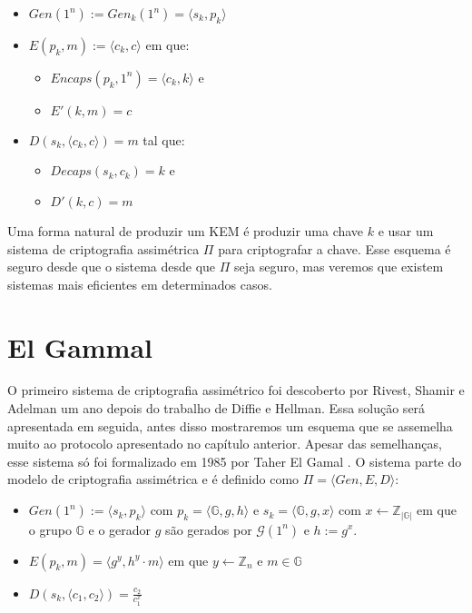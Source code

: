 \begin{itemize}
\item $Gen(1^n) := Gen_k(1^n) = \langle s_k, p_k \rangle$
\item $E(p_k, m) := \langle c_k, c \rangle$ em que: 
\begin{itemize}
\item $Encaps(p_k, 1^n) = \langle c_k, k \rangle$ e
\item $E'(k, m) = c$
\end{itemize}
\item $D(s_k,\langle c_k, c \rangle) = m$ tal que:
\begin{itemize}
\item $Decaps(s_k, c_k) = k$ e
\item $D'(k, c) = m$
\end{itemize}
\end{itemize}

Uma forma natural de produzir um KEM é produzir uma chave $k$ e usar um sistema de criptografia assimétrica $\Pi$ para criptografar a chave.
Esse esquema é seguro desde que o sistema desde que $\Pi$ seja seguro, mas veremos que existem sistemas mais eficientes em determinados casos.


\section{El Gammal}
\label{sec:el-gammal}
O primeiro sistema de criptografia assimétrico foi descoberto por Rivest, Shamir e Adelman um ano depois do trabalho de Diffie e Hellman.
Essa solução será apresentada em seguida, antes disso mostraremos um esquema que se assemelha muito ao protocolo apresentado no capítulo anterior.
Apesar das semelhanças, esse sistema só foi formalizado em 1985 por Taher El Gamal \cite{ElGamal85}.
O sistema parte do modelo de criptografia assimétrica e é definido como $\Pi= \langle Gen, E, D\rangle$:
\begin{itemize}
\item $Gen(1^n) := \langle s_k, p_k \rangle$ com $p_k = \langle \mathbb{G}, g, h \rangle$ e $s_k = \langle \mathbb{G}, g, x \rangle$ com $x \leftarrow \mathbb{Z}_{|\mathbb{G}|}$ em que o grupo $\mathbb{G}$ e o gerador $g$ são gerados por $\mathcal{G}(1^n)$ e $h := g^x$.
\item $E(p_k, m) = \langle g^y, h^y \cdot m\rangle$ em que $y \leftarrow \mathbb{Z}_n$ e $m \in \mathbb{G}$
\item $D(s_k, \langle c_1, c_2 \rangle) = \frac{c_2}{c_1^x}$
\end{itemize}

